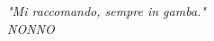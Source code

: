 \vspace*{6cm}
\hspace*{7cm} %
\begin{minipage}{0.5\textwidth}
    \raggedright
    \textit{"Mi raccomando, sempre in gamba."}\\[1em]
    \hspace*{5cm}\textit{NONNO}
\end{minipage}
